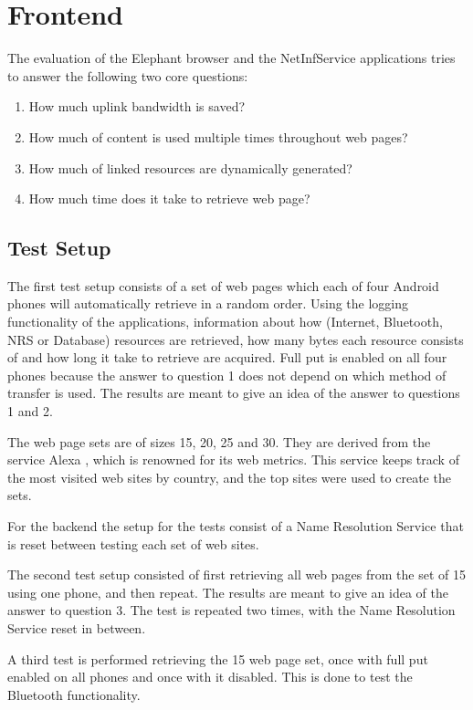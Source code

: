 \section{Frontend}

The evaluation of the Elephant browser and the NetInfService applications tries to answer the following two core questions:

\begin{enumerate}
\item How much uplink bandwidth is saved?
\item How much of content is used multiple times throughout web pages?
\item How much of linked resources are dynamically generated?
\item How much time does it take to retrieve web page?
\end{enumerate}

\subsection{Test Setup}

The first test setup consists of a set of web pages which each of four Android phones will automatically retrieve in a random order. Using the logging functionality of the applications, information about how (Internet, Bluetooth, NRS or Database) resources are retrieved, how many bytes each resource consists of and how long it take to retrieve are acquired. Full put is enabled on all four phones because the answer to question 1 does not depend on which method of transfer is used. The results are meant to give an idea of the answer to questions 1 and 2.

The web page sets are of sizes 15, 20, 25 and 30. They are derived from the service Alexa \cite{alexa}, which is renowned for its web metrics. This service keeps track of the most visited web sites by country, and the top sites were used to create the sets.

For the backend the setup for the tests consist of a Name Resolution Service that is reset between testing each set of web sites.

The second test setup consisted of first retrieving all web pages from the set of 15 using one phone, and then repeat. The results are meant to give an idea of the answer to question 3. The test is repeated two times, with the Name Resolution Service reset in between. 

A third test is performed retrieving the 15 web page set, once with full put enabled on all phones and once with it disabled. This is done to test the Bluetooth functionality.


